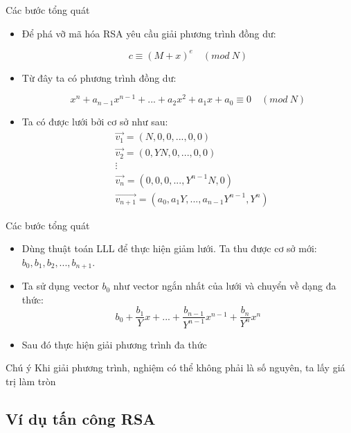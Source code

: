 \begin{frame}{Các bước tổng quát}

\begin{itemize}
\item Để phá vỡ mã hóa RSA yêu cầu giải phương trình đồng dư:

$$c \equiv (M + x)^e \quad (mod \ N)$$
\item Từ đây ta có phương trình đồng dư:

$$x^n + a_{n-1}x^{n-1} + ... + a_2x^2 + a_1x + a_0 \equiv 0 \quad (mod \ N) $$

\item Ta có được lưới bởi cơ sở như sau:
$$
\begin{aligned}
&\Vec{v_1} = (N, 0, 0, ..., 0, 0)\\
&\Vec{v_2} = (0, YN, 0, ..., 0, 0)\\
&\vdots\\
&\Vec{v_n} = (0, 0, 0, ..., Y^{n-1}N, 0)\\
&\Vec{v_{n+1}} = (a_0, a_1Y, ..., a_{n-1}Y^{n-1}, Y^{n})
\end{aligned}
$$

\end{itemize}
\end{frame}
\begin{frame}{Các bước tổng quát}

\begin{itemize}
\item Dùng thuật toán LLL để thực hiện giảm lưới. Ta thu được cơ sở mới: $b_0, b_1, b_2, ..., b_{n+1}$.
\item Ta sử dụng vector $b_0$ như vector ngắn nhất của lưới và chuyển về dạng đa thức:
$$b_0 + \frac{b_1}{Y}x + ... + \frac{b_{n-1}}{Y^{n-1}}x^{n-1} + \frac{b_n}{Y^n}x^n $$
\item Sau đó thực hiện giải phương trình đa thức
\end{itemize}

\begin{block}{Chú ý}
Khi giải phương trình, nghiệm có thể không phải là số nguyên, ta lấy giá trị làm tròn
\end{block}

\end{frame}
\subsection{Ví dụ tấn công RSA}

